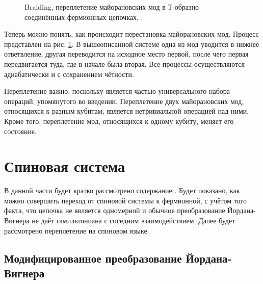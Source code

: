 \documentclass[a4paper,12pt]{article}
\theoremstyle{plain} %
\theoremstyle{definition} %
\theoremstyle{remark} %
\begin{document}
\begin{figure}
    \centering
    \caption{Braiding, переплетение майорановских мод в Т-образно соединённых фермионных цепочках, \cite{braiding}.}
    \label{fig:braiding}
\end{figure}

Теперь можно понять, как происходит перестановка майорановских мод. Процесс представлен на рис. \ref{fig:braiding}. В вышеописанной системе одна из мод уводится в нижнее ответвление, другая переводится на исходное место первой, после чего первая передвигается туда, где в начале была вторая. Все процессы осуществляются адиабатически и с сохранением чётности.

Переплетение важно, поскольку является частью универсального набора операций, упомянутого во введении. Переплетение двух майорановских мод, относящихся к разным кубитам, является нетривиальной операцией над ними. Кроме того, переплетение мод, относящихся к одному кубиту, меняет его состояние.


\pagebreak

\section{Спиновая система} \label{sec:spin_system}

В данной части будет кратко рассмотрено содержание \cite{main}. Будет показано, как можно совершить переход от спиновой системы к фермионной, с учётом того факта, что цепочка не является одномерной и обычное преобразование Йордана-Вигнера не даёт гамильтониана с соседним взаимодействием. Далее будет рассмотрено переплетение на спиновом языке.

\subsection{Модифицированное преобразование Йордана-Вигнера}
\end{document}
